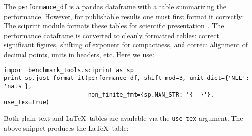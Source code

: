 \documentclass{article}
\newcommand{\code}{\texttt}
\begin{document}
The \code{performance\_df} is a pandas dataframe with a table summarizing the performance.
However, for publishable results one must first format it correctly:
The sciprint module formats these tables for scientific presentation~\citep{Cole2015}.
The performance dataframe is converted to cleanly formatted tables: correct significant figures, shifting of exponent for compactness, and correct alignment of decimal points, units in headers, etc.
Here we use:
\begin{verbatim}
import benchmark_tools.sciprint as sp
print sp.just_format_it(performance_df, shift_mod=3, unit_dict={'NLL': 'nats'},
                        non_finite_fmt={sp.NAN_STR: '{--}'}, use_tex=True)
\end{verbatim}
Both plain text and \LaTeX\ tables are available via the \code{use\_tex} argument.
The above snippet produces the \LaTeX\ table:\\
\end{document}

